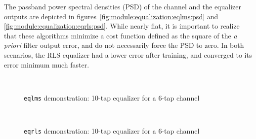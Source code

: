 The passband power spectral densities (PSD) of the channel and the equalizer outputs
are depicted in figures~\ref{fig:module:equalization:eqlms:psd} and \ref{fig:module:equalization:eqrls:psd}.
While nearly flat, it is important to realize that these algorithms minimize
a cost function defined as the square of the {\it a priori} filter output error,
and do not necessarily force the PSD to zero.
In both scenarios, the RLS equalizer had a lower error after training, and converged to its
error minimum much faster.



\begin{figure}[ht]
\centering
\mbox{
   \quad
   \quad
}
\mbox{
   \quad
   \quad
}
\caption{{\tt eqlms} demonstration: 10-tap equalizer for a 6-tap channel}
\label{fig:module:equalization:eqlms}
\end{figure}


\begin{figure}[ht]
\centering
\mbox{
  \subfigure[PSD] {
      \label{fig:module:equalization:eqrls:psd}
    } \quad
  \subfigure[constellation] {
      \label{fig:module:equalization:eqrls:constellation}
    } \quad
}
\mbox{
  \subfigure[taps] {
      \label{fig:module:equalization:eqrls:taps}
    } \quad
   \quad
}
\caption{{\tt eqrls} demonstration: 10-tap equalizer for a 6-tap channel}
\label{fig:module:equalization:eqrls}
\end{figure}


